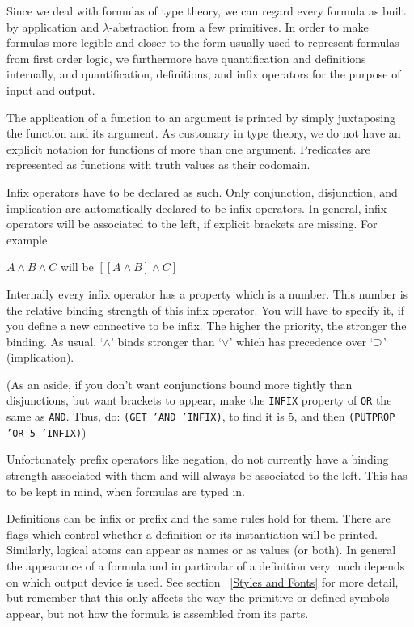 Since we deal with formulas of type theory, we can regard every formula
as built by application and $\lambda$-abstraction from a few primitives.
In order to make formulas more legible and closer to the form usually
used to represent formulas from first order logic, we furthermore have
quantification and definitions
internally, and quantification, definitions, and infix operators
for the purpose of input and output.

The application of a function to an argument is printed by simply
juxtaposing the function and its argument.  As customary in type
theory, we do not have an explicit notation for functions of more
than one argument.  Predicates are represented as functions with truth
values as their codomain.

Infix operators have to be declared as such.
Only conjunction, disjunction, and implication are automatically
declared to be infix operators.  In general,
infix operators
will be associated to the left, if  explicit brackets are missing.
For example
\begin{Example}
$A \land B \land C$    will be  $[[A \land B] \land C]$
\end{Example}
Internally every infix operator has a property 
which is a number. This number is the relative binding strength of
this infix operator. You will have to specify it, if you define a
new connective to be infix. The higher the priority, the stronger
the binding. As usual, `$\land$' binds stronger than `$\lor$' which has precedence
over `$\mathbin{\supset}$' (implication).

(As an aside, if you don't want conjunctions bound more tightly than disjunctions,
but want brackets to appear, make the {\tt INFIX} property of {\tt OR} the same
as {\tt AND}. Thus, do: {\tt (GET 'AND 'INFIX)}, to find it is 5, and then 
{\tt (PUTPROP 'OR 5 'INFIX)})

Unfortunately prefix operators like negation, do not currently  have
a binding strength associated with them and will always be associated
to the left.
This has to be kept in mind, when formulas are typed in.

Definitions can be infix or prefix and the same rules hold for them.
There are flags which control whether a definition or its instantiation
will be printed. Similarly, logical atoms can appear as names or as
values (or both).  In general the appearance of a formula and in particular
of a definition very much depends on which output device is used.  See
section ~\ref{Styles and Fonts} for more detail, but remember that this
only affects the way the primitive or defined symbols appear, but not
how the formula is assembled from its parts.

